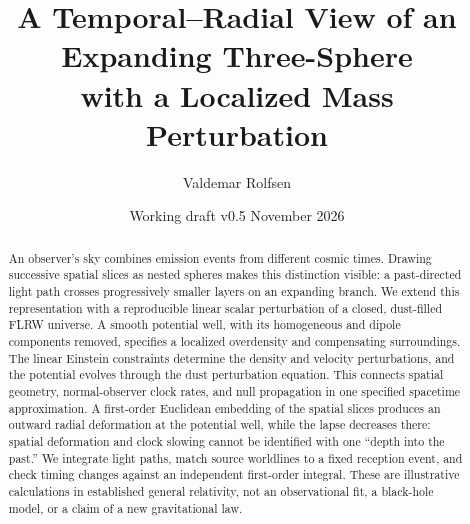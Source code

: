 \documentclass[11pt,a4paper]{article}
\title{A Temporal--Radial View of an Expanding Three-Sphere\\with a Localized Mass Perturbation}
\author{Valdemar Rolfsen}
\date{Working draft v0.5 \quad 27 November 2026}
\begin{document}
\maketitle
\begin{abstract}
An observer's sky combines emission events from different cosmic times.
Drawing successive spatial slices as nested spheres makes this distinction
visible: a past-directed light path crosses progressively smaller layers on
an expanding branch. We extend this representation with a reproducible
linear scalar perturbation of a closed, dust-filled FLRW universe. A smooth
potential well, with its homogeneous and dipole components removed, specifies
a localized overdensity and compensating surroundings. The linear Einstein
constraints determine the density and velocity perturbations, and the
potential evolves through the dust perturbation equation. This connects
spatial geometry, normal-observer clock rates, and null propagation in one
specified spacetime approximation. A first-order Euclidean embedding of the
spatial slices produces an outward radial deformation at the potential well,
while the lapse decreases there: spatial deformation and clock slowing
cannot be identified with one ``depth into the past.'' We integrate light
paths, match source worldlines to a fixed reception event, and check timing
changes against an independent first-order integral. These are illustrative
calculations in established general relativity, not an observational fit,
a black-hole model, or a claim of a new gravitational law.
\end{abstract}







\appendix



\end{document}
